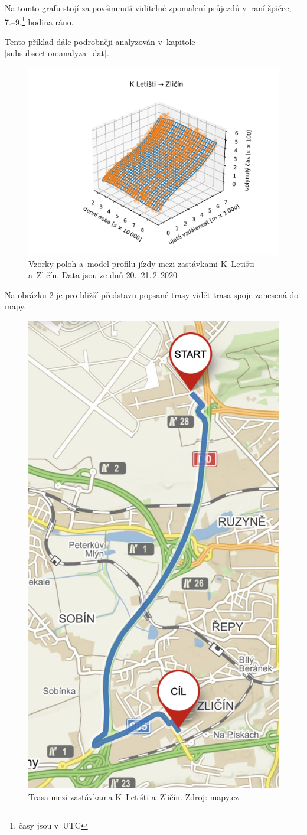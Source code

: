 \bigbreak

Na tomto grafu stojí za povšimnutí viditelné zpomalení průjezdů v~raní špičce, 7.--9.\footnote{časy jsou v~UTC} hodina ráno.

\bigbreak

Tento příklad dále podrobněji analyzován v~kapitole \ref{subsubsection:analyza_dat}.

\begin{figure}
  \includegraphics[width=\linewidth]{../img/534_421}
  \caption{Vzorky poloh a~model profilu jízdy mezi zastávkami K~Letišti a~Zličín. Data jsou ze dnů 20.--21.\,2.\,2020}
  \label{fig:k_letisti_to_zlicin_3d}
\end{figure}

\bigbreak

Na obrázku \ref{fig:k_letisti_to_zlicin_map} je pro bližší představu popsané trasy vidět trasa spoje zanesená do mapy.

\begin{figure}
	\centering
  \includegraphics[width=0.3\linewidth]{../img/k_letisti_to_zlicin_map.png}
  \caption{Trasa mezi zastávkama K~Letišti a~Zličín. Zdroj: mapy.cz}
  \label{fig:k_letisti_to_zlicin_map}
\end{figure}

